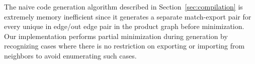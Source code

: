 
The naive code generation algorithm described in Section~\ref{sec:compilation} is extremely memory inefficient since it generates a separate match-export pair for every unique in edge/out edge pair in the product graph before minimization. Our implementation performs partial minimization during generation by recognizing cases where there is no restriction on exporting or importing from neighbors to avoid enumerating such cases.
